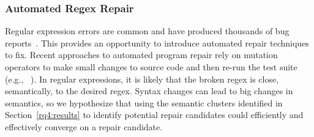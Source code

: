 
\subsubsection{Automated Regex Repair}
Regular expression errors are common and have produced thousands of bug reports~\cite{Spishak:2012:TSR:2318202.2318207}. This provides an opportunity to introduce automated repair techniques to fix.
Recent approaches to automated program repair rely on mutation operators to make small changes to source code and then re-run the test suite (e.g., ~\cite{cacm10, genprog-tse-journal}). In regular expressions, it is likely that the broken regex is close, semantically, to the desired regex. Syntax changes can lead to big changes in semantics, so we hypothesize that using the semantic clusters identified in Section~\ref{rq4:results} to identify potential repair candidates could efficiently and effectively converge on a repair candidate.





